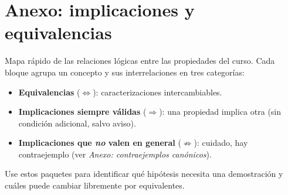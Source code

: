 \documentclass[11pt,twoside]{article}
\begin{document}
\renewcommand{\arraystretch}{1.0}
\newpage
\section{Anexo: implicaciones y equivalencias}

Mapa rápido de las relaciones lógicas entre las propiedades del curso. Cada bloque agrupa un concepto y sus interrelaciones en tres categorías:
\begin{itemize}[leftmargin=2em]
\item \textbf{Equivalencias} ($\Leftrightarrow$): caracterizaciones intercambiables.
\item \textbf{Implicaciones siempre válidas} ($\Rightarrow$): una propiedad implica otra (sin condición adicional, salvo aviso).
\item \textbf{Implicaciones que \emph{no} valen en general} ($\not\Rightarrow$): cuidado, hay contraejemplo (ver \emph{Anexo: contraejemplos canónicos}).
\end{itemize}
Use estos paquetes para identificar qué hipótesis necesita una demostración y cuáles puede cambiar libremente por equivalentes.

\medskip
\end{document}
